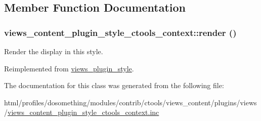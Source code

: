 \subsection{Member Function Documentation}
\hypertarget{classviews__content__plugin__style__ctools__context_a7b49db120c1bfa8e951e70bb24da42f1}{
\subsubsection[{render}]{\setlength{\rightskip}{0pt plus 5cm}views\_\-content\_\-plugin\_\-style\_\-ctools\_\-context::render ()}}
\label{classviews__content__plugin__style__ctools__context_a7b49db120c1bfa8e951e70bb24da42f1}
Render the display in this style. 

Reimplemented from \hyperlink{classviews__plugin__style_aa52b618e91b11a7d10ad1feadbc891f1}{views\_\-plugin\_\-style}.

The documentation for this class was generated from the following file:\begin{DoxyCompactItemize}
\item 
html/profiles/dosomething/modules/contrib/ctools/views\_\-content/plugins/views/\hyperlink{views__content__plugin__style__ctools__context_8inc}{views\_\-content\_\-plugin\_\-style\_\-ctools\_\-context.inc}\end{DoxyCompactItemize}

